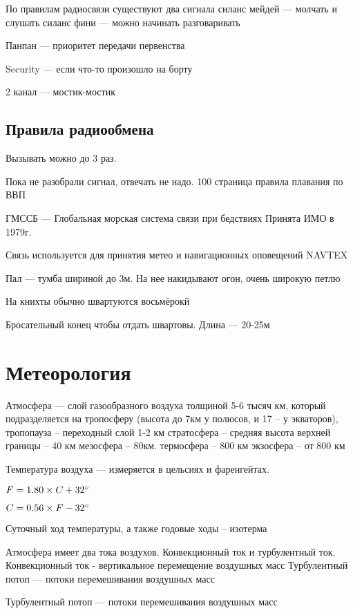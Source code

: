 \documentclass{article}        %
\begin{document}
По правилам радиосвязи существуют два сигнала
силанс мейдей --- молчать и слушать
силанс фини --- можно начинать разговаривать

Панпан --- приоритет передачи первенства

Security --- если что-то произошло на борту

2 канал --- мостик-мостик



\subsection{Правила радиообмена}

Вызывать можно до 3 раз.

Пока не разобрали сигнал, отвечать не надо. 
100 страница правила плавания по ВВП

ГМССБ --- Глобальная морская система связи при бедствиях
Принята ИМО в 1979г.

Связь используется для принятия метео и навигационных оповещений
NAVTEX




Пал --- тумба шириной до 3м. На нее накидывают огон, очень широкую петлю

На книхты обычно швартуются восьмёрокй

Бросательный конец чтобы отдать швартовы. Длина --- 20-25м

\section{Метеорология}
Атмосфера --- слой газообразного воздуха толщиной 5-6 тысяч км, 
который подразделяется на тропосферу (высота до 7км у полюсов, и 17 -- у экваторов),
тропопауза -- переходный слой 1-2 км
стратосфера -- средняя высота верхней границы -- 40 км
мезосфера -- 80км.
термосфера -- 800 км
экзосфера -- от 800 км

Температура воздуха --- измеряется в цельсиях и фаренгейтах.

 $F = 1.80\times C + 32\degree$

$ C = 0.56\times F - 32 \degree$

Суточный ход температуры, а также годовые ходы -- изотерма

Атмосфера имеет два тока воздухов. Конвекционный ток и турбулентный ток. 
Конвекционный ток - вертикальное перемещение воздушных масс
Турбулентный потоп --- потоки перемешивания воздушных масс

Турбулентный потоп --- потоки перемешивания воздушных масс
\end{document}
